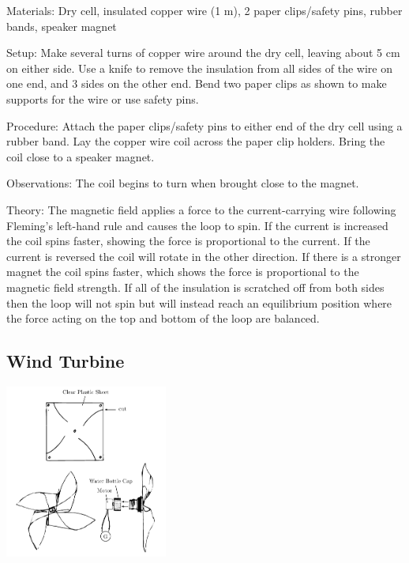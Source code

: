 \begin{multicols}{2}
\begin{description*}
\item[Materials:]{Dry cell, insulated copper wire (1 m), 2 paper clips/safety pins, rubber bands, speaker magnet}
\item[Setup:]{Make several turns of copper wire around the dry cell, leaving about 5 cm on either side. Use a knife to remove the insulation from all sides of the wire on one end, and 3 sides on the other end. Bend two paper clips as shown to make supports for the wire or use safety pins.}
\item[Procedure:]{Attach the paper clips/safety pins to either end of the dry cell using a rubber band. Lay the copper wire coil across the paper clip holders. Bring the coil close to a speaker magnet.}
\item[Observations:]{The coil begins to turn when brought close to the magnet.}
\item[Theory:]{The magnetic field applies a force to the current-carrying wire following Fleming's left-hand rule and causes the loop to spin. If the current is increased the coil spins faster, showing the force is proportional to the current. If the current is reversed the coil will rotate in the other direction. If there is a stronger magnet the coil spins faster, which shows the force is proportional to the magnetic field strength. If all of the insulation is scratched off from both sides then the loop will not spin but will instead reach an equilibrium position where the force acting on the top and bottom of the loop are balanced.}
\end{description*}

\subsection{Wind Turbine}

\begin{center}
\includegraphics[width=0.4\textwidth]{./img/wind-turbine.png}
\end{center}


\end{multicols}
